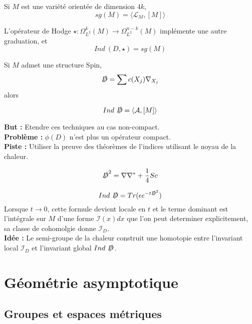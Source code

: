 \documentclass{beamer}
\begin{document}
\begin{frame}
\begin{thm}[Hirzebruch] Si $M$ est une variété orientée de dimension $4k$,
\[sg(M)  = \langle \mathcal L_M, [M]\rangle\]

\end{thm}
L'opérateur de Hodge $\star : \Omega^{k}_{L^2}(M)\rightarrow \Omega_{L^2}^{n-k}(M)$ implémente une autre graduation, et 
\[Ind \ (D,\star) =sg(M)  \]
\end{frame}

\begin{frame}
Si $M$ admet une structure Spin,
\[\slashed D = \sum c(X_j) \nabla_{X_j}\]
alors 
\begin{thm}
\[Ind \ \slashed D= \langle \mathcal A,[M]\rangle\]
\end{thm}
\end{frame}

\begin{frame}
\textbf{But :} Etendre ces techniques au cas non-compact.\\

\textbf{Problème :} $\phi(D)$ n'est plus un opérateur compact.\\

\textbf{Piste :} Utiliser la preuve des théorèmes de l'indices utilisant le noyau de la chaleur.\\
\end{frame}

\begin{frame}
\begin{prop}
\[\slashed D^2 =\nabla \nabla^* +\frac{1}{4} Sc \]
\end{prop}

\[Ind \ \slashed D = Tr(\epsilon e^{-t\slashed D^2})\]
Lorsque $t\rightarrow 0$, cette formule devient locale en $t$ et le terme dominant est l'intégrale sur $M$ d'une forme $\mathcal I(x)dx$ que l'on peut determiner explicitement, sa classe de cohomolgie donne $\mathcal I_D$.\\

\textbf{Idée :} Le semi-groupe de la chaleur construit une homotopie entre l'invariant local $\mathcal I_D$ et l'invariant global $Ind \ \slashed D$.  
\end{frame}

\section{Géométrie asymptotique}
\subsection{Groupes et espaces métriques}
\end{document}
